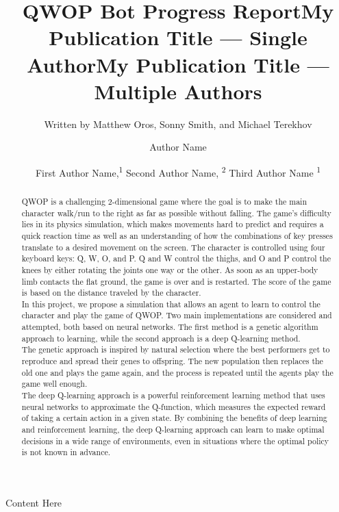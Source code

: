 \documentclass[letterpaper]{article} %
\title{QWOP Bot Progress Report}
\author{
    Written by Matthew Oros, Sonny Smith, and Michael Terekhov \\ 
}
\title{My Publication Title --- Single Author}
\author {
    Author Name \\
}
\title{My Publication Title --- Multiple Authors}
\author {
    First Author Name,\textsuperscript{\rm 1}
    Second Author Name, \textsuperscript{\rm 2}
    Third Author Name \textsuperscript{\rm 1} \\
}
\begin{document}
\maketitle

\begin{abstract}
QWOP is a challenging 2-dimensional game where the goal is to make the main character walk/run to the right as far as possible without falling.
The game's difficulty lies in its physics simulation, which makes movements hard to predict and requires a quick reaction time as well as an understanding of how the combinations of key presses translate to a desired movement on the screen.
The character is controlled using four keyboard keys: Q, W, O, and P. Q and W control the thighs, and O and P control the knees by either rotating the joints one way or the other.
As soon as an upper-body limb contacts the flat ground, the game is over and is restarted.
The score of the game is based on the distance traveled by the character.\\
In this project, we propose a simulation that allows an agent to learn to control the character and play the game of QWOP. Two main implementations are considered and attempted, both based on neural networks.
The first method is a genetic algorithm approach to learning, while the second approach is a deep Q-learning method.\\
The genetic approach is inspired by natural selection where the best performers get to reproduce and spread their genes to offspring.
The new population then replaces the old one and plays the game again, and the process is repeated until the agents play the game well enough.\\
The deep Q-learning approach is a powerful reinforcement learning method that uses neural networks to approximate the Q-function, which measures the expected reward of taking a certain action in a given state.
By combining the benefits of deep learning and reinforcement learning, the deep Q-learning approach can learn to make optimal decisions in a wide range of environments, even in situations where the optimal policy is not known in advance.\\
\end{abstract}

\noindent Content Here
\end{document}
